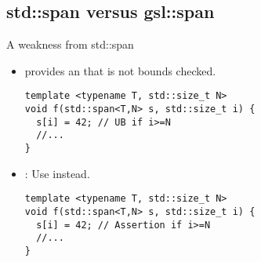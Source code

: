 \subsection{std::span versus gsl::span}

\begin{frame}[t,fragile]{A weakness from std::span}
\begin{itemize}
  \item {} provides an 
        that is not bounds checked.
\begin{lstlisting}
template <typename T, std::size_t N>
void f(std::span<T,N> s, std::size_t i) {
  s[i] = 42; // UB if i>=N
  //...
}
\end{lstlisting}

  \item {}: Use  instead.
\begin{lstlisting}
template <typename T, std::size_t N>
void f(std::span<T,N> s, std::size_t i) {
  s[i] = 42; // Assertion if i>=N
  //...
}
\end{lstlisting}

\end{itemize}
\end{frame}
